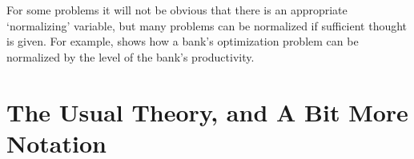 \documentclass[titlepage, headings=optiontotocandhead]{\econtex}
\begin{document}
For some problems it will not be obvious that there is an appropriate
`normalizing' variable, but many problems can be normalized if
sufficient thought is given.  For example, \cite{valencia:2006} shows
how a bank's optimization problem can be normalized by the level of
the bank's productivity.


\hypertarget{The-Usual-Theory}{}
\section{The Usual Theory, and A Bit More Notation}
\label{sec:usualtheory}
\end{document}
